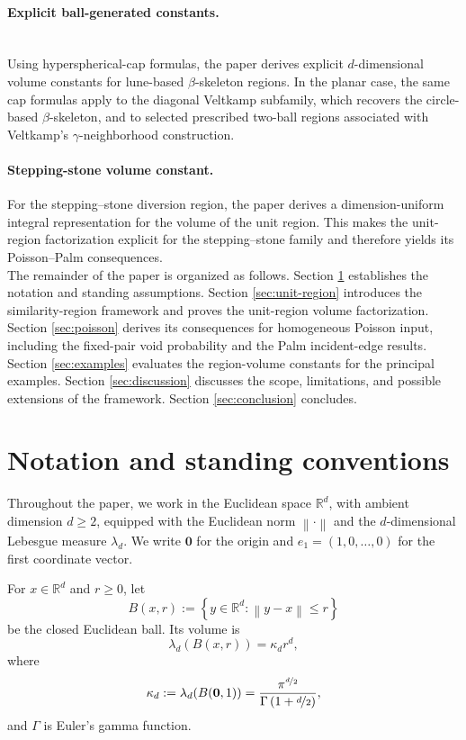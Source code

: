 \documentclass[a4paper,fleqn]{cas-dc}
\numberwithin{equation}{section}
\newcommand{\R}{\mathds{R}}
\newcommand{\1}{\mathds{1}}
\newcommand{\norm}[1]{\left\lVert #1\right\rVert}
\newcommand{\set}[1]{\left\{#1\right\}}
\newcommand{\0}{\mathbf{0}}
\begin{document}
\paragraph{Explicit ball-generated constants.}
\leavevmode\\
Using hyperspherical-cap formulas, the paper derives explicit
\(d\)-dimensional volume constants for lune-based \(\beta\)-skeleton
regions. In the planar case, the same cap formulas apply to the
diagonal Veltkamp subfamily, which recovers the circle-based
\(\beta\)-skeleton, and to selected prescribed two-ball regions
associated with Veltkamp's \(\gamma\)-neighborhood construction.


 \paragraph{Stepping-stone volume constant.}
For the stepping--stone diversion region, the paper derives a dimension-uniform integral representation for the volume of the unit region.
This makes the unit-region factorization explicit for the stepping--stone family and therefore yields its Poisson--Palm consequences.\\

The remainder of the paper is organized as follows.
Section \ref{sec:notation} establishes the notation and standing assumptions.
Section \ref{sec:unit-region} introduces the similarity-region framework and proves the unit-region volume factorization.
Section \ref{sec:poisson} derives its consequences for homogeneous Poisson input, including the fixed-pair void probability and the Palm incident-edge results.
Section \ref{sec:examples} evaluates the region-volume constants for the principal examples.
Section \ref{sec:discussion} discusses the scope, limitations, and possible extensions of the framework.
Section \ref{sec:conclusion} concludes.



\section{Notation and standing conventions}\label{sec:notation}

Throughout the paper, we work in the Euclidean space \(\R^d\), with ambient dimension \(d\geq2\), equipped with the Euclidean norm \(\norm{\cdot}\) and the $d$-dimensional Lebesgue measure \(\lambda_d\). We write $\0$ for the origin  and \(e_1=(1,0,\ldots,0)\) for the first coordinate vector. 

For \(x\in\R^d\) and \(r\ge0\), let
\begin{equation}
        B(x,r):=\set{y\in\R^d:\norm{y-x}\le r}
\end{equation}
be the closed Euclidean ball.  Its volume is
\begin{equation}\label{eq:ball-volume}
        \lambda_d(B(x,r))=\kappa_d r^d,
\end{equation}
where
\begin{equation}
        \kappa_d:=\lambda_d(B(\0,1))
        =
        \frac{\pi^{\nicefrac{d}{2}}}{\Gamma\left(1+\nicefrac{d}{2}\right)},
\end{equation}
and \(\Gamma\) is Euler's gamma function.
\end{document}
